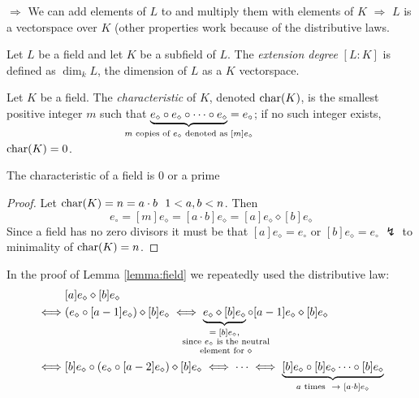 \begin{remark}
$\Rightarrow$ We can add elements of $L$ to and multiply them with elements of $K$ $\Rightarrow$ $L$ is a vectorspace over $K$ (other properties work because of the distributive laws.
\end{remark}

\begin{definition}
Let $L$ be a field and let $K$ be a subfield of $L$. The \emph{extension degree} $[L:K]$ is defined as $\dim_k L$, the dimension of $L$ as a $K$ vectorspace. 
\end{definition}

\begin{definition}[Characteristic]
Let $K$ be a field. The \emph{characteristic} of $K$, denoted $\operatorname{char}(K)$, is the smallest positive integer $m$ such that $\underbrace{e_{\diamond} \circ e_{\diamond} \circ \dots \circ e_{\diamond}}_{\makebox[0pt]{$\scriptsize\begin{array}{c}m \text{ copies of } e_{\diamond} \text{ denoted as } [m]e_{\diamond}\end{array}$}} = e_{\circ}$; if no such integer exists, $\operatorname{char}(K) = 0$.
\end{definition}

\begin{lemma} \label{lemma:field}
The characteristic of a field is $0$ or a prime
\begin{proof}
Let $\operatorname{char}(K) = n = a \cdot b \,\,\,\, 1<a,b<n$. Then
\[
	e_{\circ} = [m]e_{\diamond} = [a \cdot b]e_{\diamond} = [a]e_{\diamond} \diamond [b]e_{\diamond}
\]
Since a field has no zero divisors it must be that $[a]e_{\diamond} = e_{\circ}$ or $[b]e_{\diamond} = e_{\circ} \,\, \lightning$ to minimality of $\operatorname{char}(K) = n$.
\end{proof}
\end{lemma}

\begin{remark}
In the proof of Lemma \ref{lemma:field} we repeatedly used the distributive law:
\begin{align*}
&[a]e_{\diamond} \diamond [b]e_{\diamond} \\
\iff &(e_{\diamond} \circ [a-1]e_{\diamond}) \diamond [b]e_{\diamond} 
\iff \underbrace{e_{\diamond} \diamond [b]e_{\diamond}}_{\makebox[0pt]{$\scriptsize\begin{array}{c}= [b]e_{\diamond}, \\ \text{ since }e_{\diamond} \text{ is the neutral} \\ \text{ element for } \diamond \end{array}$}} \circ [a-1]e_{\diamond} \diamond [b]e_{\diamond} \\
\iff &[b]e_{\diamond} \circ (e_{\diamond} \circ [a-2]e_{\diamond}) \diamond [b]e_{\diamond} 
\iff \dots \iff \underbrace{[b]e_{\diamond} \circ [b]e_{\diamond} \dots \circ [b]e_{\diamond}}_{a \text{ times } \,\, \rightarrow \,\, [a \cdot b]e_{\diamond}}
\end{align*}
\end{remark}

